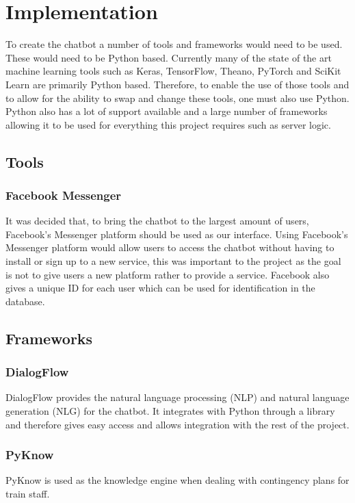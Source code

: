 \documentclass[12pt,a4paper]{article}
\begin{document}
    \section{Implementation}
    
    To create the chatbot a number of tools and frameworks would need to be used. These would need to be Python based. Currently many of the state of the art machine learning tools such as Keras, TensorFlow, Theano, PyTorch and SciKit Learn are primarily Python based. Therefore, to enable the use of those tools and to allow for the ability to swap and change these tools, one must also use Python. Python also has a lot of support available and a large number of frameworks allowing it to be used for everything this project requires such as server logic.
    
    \subsection{Tools}
    \subsubsection{Facebook Messenger}
    It was decided that, to bring the chatbot to the largest amount of users, Facebook's Messenger platform should be used as our interface. Using Facebook's Messenger platform would allow users to access the chatbot without having to install or sign up to a new service, this was important to the project as the goal is not to give users a new platform rather to provide a service. Facebook also gives a unique ID for each user which can be used for identification in the database.
    \subsection{Frameworks}
    \subsubsection{DialogFlow}
    DialogFlow provides the natural language processing (NLP) and natural language generation (NLG) for the chatbot. It integrates with Python through a library and therefore gives easy access and allows integration with the rest of the project.
    \subsubsection{PyKnow}
    PyKnow is used as the knowledge engine when dealing with contingency plans for train staff. 
\end{document}
